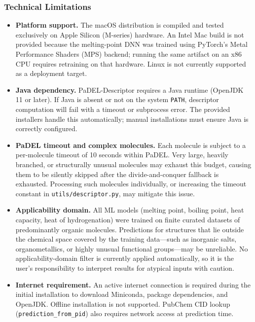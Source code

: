 \subsubsection*{Technical Limitations}
\begin{itemize}
  \item \textbf{Platform support.}
        The macOS distribution is compiled and tested exclusively on
        Apple Silicon (M-series) hardware.
        An Intel Mac build is not provided because the melting-point DNN was
        trained using PyTorch's Metal Performance Shaders (MPS) backend; running
        the same artifact on an x86 CPU requires retraining on that hardware.
        Linux is not currently supported as a deployment target.

  \item \textbf{Java dependency.}
        PaDEL-Descriptor requires a Java runtime (OpenJDK 11 or later).
        If Java is absent or not on the system \texttt{PATH}, descriptor
        computation will fail with a timeout or subprocess error.
        The provided installers handle this automatically; manual installations
        must ensure Java is correctly configured.

  \item \textbf{PaDEL timeout and complex molecules.}
        Each molecule is subject to a per-molecule timeout of 10 seconds within
        PaDEL.
        Very large, heavily branched, or structurally unusual molecules may
        exhaust this budget, causing them to be silently skipped after the
        divide-and-conquer fallback is exhausted.
        Processing such molecules individually, or increasing the timeout
        constant in \texttt{utils/descriptor.py}, may mitigate this issue.

  \item \textbf{Applicability domain.}
        All ML models (melting point, boiling point, heat capacity, heat of
        hydrogenation) were trained on finite curated datasets of predominantly
        organic molecules.
        Predictions for structures that lie outside the chemical space covered
        by the training data---such as inorganic salts, organometallics, or
        highly unusual functional groups---may be unreliable.
        No applicability-domain filter is currently applied automatically,
        so it is the user's responsibility to interpret results for atypical
        inputs with caution.

  \item \textbf{Internet requirement.}
        An active internet connection is required during the initial
        installation to download Miniconda, package dependencies, and OpenJDK.
        Offline installation is not supported.
        PubChem CID lookup (\texttt{prediction\_from\_pid}) also requires
        network access at prediction time.
\end{itemize}

